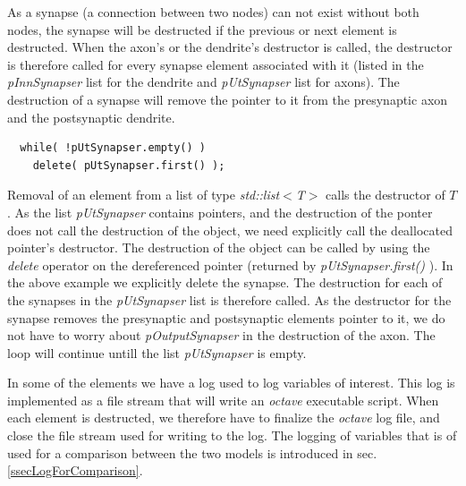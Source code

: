 	As a synapse (a connection between two nodes) can not exist without both nodes, the synapse will be destructed if the previous or next element is destructed.
	When the axon's or the dendrite's destructor is called, the destructor is therefore called for every synapse element associated with it (listed in the \emph{pInnSynapser} list for the dendrite and \emph{pUtSynapser} list for axons).
	The destruction of a synapse will remove the pointer to it from the presynaptic axon and the postsynaptic dendrite.
%

\begin{lstlisting}
  while( !pUtSynapser.empty() )
  	delete( pUtSynapser.first() );
\end{lstlisting}

	Removal of an element from a list of type \emph{std::list$<$T$>$} calls the destructor of $T$.
	As the list \emph{pUtSynapser} contains pointers, and the destruction of the ponter does not call the destruction of the object, we need explicitly call the deallocated pointer's destructor.
	The destruction of the object can be called by using the \emph{delete} operator on the dereferenced pointer (returned by \emph{pUtSynapser.first()} ).
	In the above example we explicitly delete the synapse. %
	The destruction for each of the synapses in the \emph{pUtSynapser} list is therefore called.
	As the destructor for the synapse removes the presynaptic and postsynaptic elements pointer to it, we do not have to worry about \emph{pOutputSynapser} in the destruction of the axon.
	The loop will continue untill the list \emph{pUtSynapser} is empty.


	In some of the elements we have a log used to log variables of interest.
	This log is implemented as a file stream that will write an \emph{octave} executable script.
	When each element is destructed, we therefore have to finalize the \emph{octave} log file, and close the file stream used for writing to the log. 
	The logging of variables that is of used for a comparison between the two models is introduced in sec. \ref{ssecLogForComparison}.


